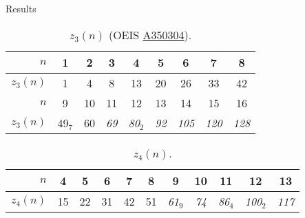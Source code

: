 \documentclass[10pt]{beamer}
\begin{document}
\begin{frame}{Results}
  \begin{table}
    \caption{$z_3(n)$ (OEIS \href{https://oeis.org/A350304}{A350304}).}
    \begin{tabular}{rcccccccc}
      \toprule
      $n$&1&2&3&4&5&6&7&8\\
      \midrule
      $z_3(n)$&1&4&8&13&20&26&33&42\\
      \bottomrule
      \toprule
      $n$&9&10&11&12&13&14&15&16\\
      \midrule
      $z_3(n)$&49$_7$&60&\textit{69}&\textit{80}$_2$&\textit{92}&\textit{105}&\textit{120}&\textit{128}\\
      \bottomrule
    \end{tabular}
  \end{table}
  \begin{table}
    \caption{$z_4(n)$.}
    \begin{tabular}{rcccccccccc}
      \toprule
      $n$&4&5&6&7&8&9&10&11&12&13\\
      \midrule
      $z_4(n)$&15&22&31&42&51&\textit{61}$_9$&\textit{74}&\textit{86}$_4$&\textit{100}$_2$&\textit{117}\\
      \bottomrule
    \end{tabular}
  \end{table}
\end{frame}
\end{document}
